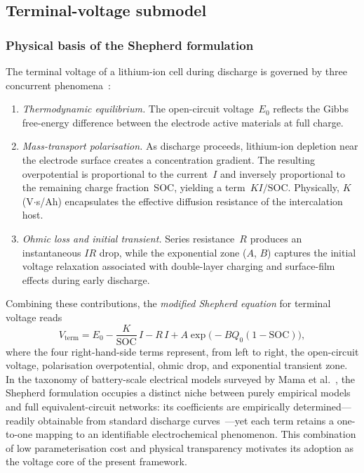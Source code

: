\documentclass[5p,times,number]{elsarticle}
\begin{document}
\subsection{Terminal-voltage submodel}\label{sec:shepherd}
\subsubsection{Physical basis of the Shepherd formulation}
The terminal voltage of a lithium-ion cell during discharge is governed by three concurrent phenomena~\cite{Shepherd1965}:
\begin{enumerate}\renewcommand{\labelenumi}{(\roman{enumi})}
    \item \emph{Thermodynamic equilibrium.} The open-circuit voltage~$E_0$ reflects the Gibbs free-energy difference between the electrode active materials at full charge.
    \item \emph{Mass-transport polarisation.} As discharge proceeds, lithium-ion depletion near the electrode surface creates a concentration gradient.  The resulting overpotential is proportional to the current~$I$ and inversely proportional to the remaining charge fraction~SOC, yielding a term~$K I/\mathrm{SOC}$.  Physically, $K$ (V$\cdot$s/Ah) encapsulates the effective diffusion resistance of the intercalation host.
    \item \emph{Ohmic loss and initial transient.}  Series resistance~$R$ produces an instantaneous $IR$ drop, while the exponential zone ($A$, $B$) captures the initial voltage relaxation associated with double-layer charging and surface-film effects during early discharge.
\end{enumerate}
Combining these contributions, the \emph{modified Shepherd equation} for terminal voltage reads
\begin{equation}\label{eq:shepherd}
V_{\mathrm{term}} = E_0 - \frac{K}{\mathrm{SOC}}\,I - R\,I + A\exp\!\bigl(-B Q_0(1-\mathrm{SOC})\bigr),
\end{equation}
where the four right-hand-side terms represent, from left to right, the open-circuit voltage, polarisation overpotential, ohmic drop, and exponential transient zone.
In the taxonomy of battery-scale electrical models surveyed by Mama et al.~\cite{Mama2025}, the Shepherd formulation occupies a distinct niche between purely empirical models and full equivalent-circuit networks: its coefficients are empirically determined---readily obtainable from standard discharge curves~\cite{Fuller2014}---yet each term retains a one-to-one mapping to an identifiable electrochemical phenomenon.
This combination of low parameterisation cost and physical transparency motivates its adoption as the voltage core of the present framework.
\end{document}
